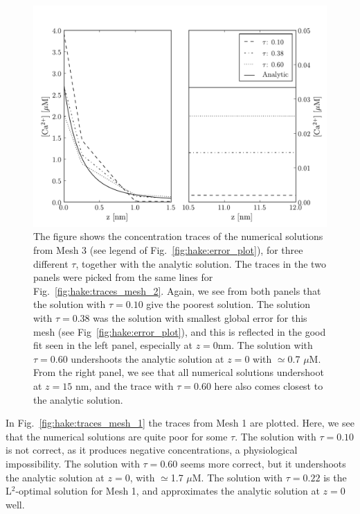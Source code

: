 \begin{figure}
  \label{fig:hake:traces_mesh_3}
  \centering
    \includegraphics[width=\largefig]{chapters/hake/pdf/traces_mesh_3}
    \caption[Concentration traces 3]{The figure shows the
      concentration traces of the numerical solutions from Mesh 3 (see
      legend of Fig.~\ref{fig:hake:error_plot}), for three different
      $\tau$, together with the analytic solution. The traces in the
      two panels were picked from the same lines for
      Fig.~\ref{fig:hake:traces_mesh_2}. Again, we see from both
      panels that the solution with $\tau=0.10$ give the poorest
      solution. The solution with $\tau=0.38$ was the solution with
      smallest global error for this mesh (see
      Fig~\ref{fig:hake:error_plot}), and this is reflected in the
      good fit seen in the left panel, especially at $z=0$nm. The
      solution with $\tau=0.60$ undershoots the analytic solution at
      $z=0$ with $\simeq$0.7 $\mu$M. From the right panel, we see that
      all numerical solutions undershoot at $z=15$ nm, and the trace
      with $\tau=0.60$ here also comes closest to the analytic
      solution.}
\end{figure}

In Fig.~\ref{fig:hake:traces_mesh_1} the traces from Mesh 1 are
plotted. Here, we see that the numerical solutions are quite poor for
some $\tau$. The solution with $\tau=0.10$ is not correct, as it
produces negative concentrations, a physiological impossibility. The
solution with $\tau=0.60$ seems more correct, but it undershoots the
analytic solution at $z=0$, with $\simeq$1.7 $\mu$M. The solution with
$\tau=0.22$ is the L$^2$-optimal solution for Mesh 1, and approximates
the analytic solution at $z=0$ well.


